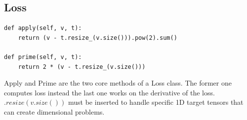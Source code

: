 \subsection{Loss}
\label{sect:Loss}

\begin{verbatim}
def apply(self, v, t):
	return (v - t.resize_(v.size())).pow(2).sum()

def prime(self, v, t):
	return 2 * (v - t.resize_(v.size()))  
\end{verbatim}
Apply and Prime are the two core methods of a Loss class. The former one computes loss instead the last one works on the derivative of the loss. \\
$ .resize(v.size()) $ must be inserted to handle specific 1D target tensors that can create dimensional problems.
   
